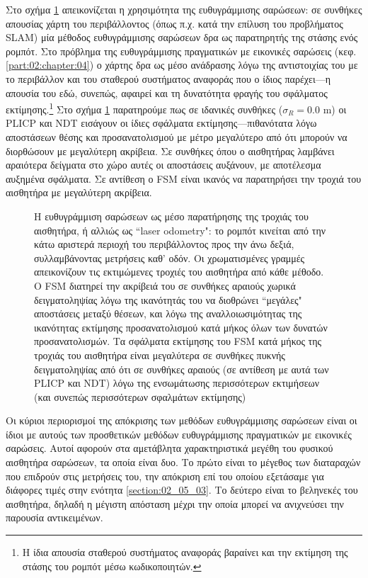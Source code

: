Στο σχήμα \ref{fig:02_05_04:01} απεικονίζεται η χρησιμότητα της ευθυγράμμισης
σαρώσεων: σε συνθήκες απουσίας χάρτη του περιβάλλοντος (όπως π.χ. κατά την
επίλυση του προβλήματος SLAM) μία μέθοδος ευθυγράμμισης σαρώσεων δρα ως
παρατηρητής της στάσης ενός ρομπότ. Στο πρόβλημα της ευθυγράμμισης πραγματικών
με εικονικές σαρώσεις (κεφ. \ref{part:02:chapter:04}) ο χάρτης δρα ως μέσο
ανάδρασης λόγω της αντιστοιχίας του με το περιβάλλον και του σταθερού
συστήματος αναφοράς που ο ίδιος παρέχει---η απουσία του εδώ, συνεπώς, αφαιρεί
και τη δυνατότητα φραγής του σφάλματος εκτίμησης.\footnote{Η ίδια απουσία
σταθερού συστήματος αναφοράς βαραίνει και την εκτίμηση της στάσης του ρομπότ
μέσω κωδικοποιητών.} Στο σχήμα \ref{fig:02_05_04:01} παρατηρούμε πως σε
ιδανικές συνθήκες ($\sigma_R = 0.0$ m) οι PLICP και NDT εισάγουν οι ίδιες
σφάλματα εκτίμησης---πιθανότατα λόγω αποστάσεων θέσης και προσανατολισμού με
μέτρο μεγαλύτερο από ότι μπορούν να διορθώσουν με μεγαλύτερη ακρίβεια. Σε
συνθήκες όπου ο αισθητήρας λαμβάνει αραιότερα δείγματα στο χώρο αυτές οι
αποστάσεις αυξάνουν, με αποτέλεσμα αυξημένα σφάλματα. Σε αντίθεση ο
FSM είναι ικανός να παρατηρήσει την τροχιά του αισθητήρα με μεγαλύτερη
ακρίβεια.

\begin{figure}[]\centering
  
  \vspace{-2cm}
  \caption{\small Η ευθυγράμμιση σαρώσεων ως μέσο παρατήρησης της τροχιάς του
           αισθητήρα, ή αλλιώς ως ``laser odometry": το ρομπότ κινείται από
           την κάτω αριστερά περιοχή του περιβάλλοντος προς την άνω δεξιά,
           συλλαμβάνοντας μετρήσεις καθ' οδόν. Οι χρωματισμένες γραμμές
           απεικονίζουν τις εκτιμώμενες τροχιές του αισθητήρα από κάθε μέθοδο.
           Ο FSM διατηρεί την ακρίβειά του σε συνθήκες αραιούς χωρικά
           δειγματοληψίας λόγω της ικανότητάς του να διοθρώνει ``μεγάλες"
           αποστάσεις μεταξύ θέσεων, και λόγω της αναλλοιωσιμότητας της
           ικανότητας εκτίμησης προσανατολισμού κατά μήκος όλων των δυνατών
           προσανατολισμών. Τα σφάλματα εκτίμησης του FSM κατά μήκος
           της τροχιάς του αισθητήρα είναι μεγαλύτερα σε συνθήκες πυκνής
           δειγματοληψίας από ότι σε συνθήκες αραιούς (σε αντίθεση με αυτά των
           PLICP και NDT) λόγω της ενσωμάτωσης περισσότερων εκτιμήσεων (και
           συνεπώς περισσότερων σφαλμάτων εκτίμησης)}
  \label{fig:02_05_04:01}
\end{figure}


Οι κύριοι περιορισμοί της απόκρισης των μεθόδων ευθυγράμμισης σαρώσεων είναι οι
ίδιοι με αυτούς των προσθετικών μεθόδων ευθυγράμμισης πραγματικών με εικονικές
σαρώσεις. Αυτοί αφορούν στα αμετάβλητα χαρακτηριστικά μεγέθη του φυσικού
αισθητήρα σαρώσεων, τα οποία είναι δυο. Το πρώτο είναι το μέγεθος των
διαταραχών που επιδρούν στις μετρήσεις του, την απόκριση επί του οποίου
εξετάσαμε για διάφορες τιμές στην ενότητα \ref{section:02_05_03}. Το δεύτερο
είναι το βεληνεκές του αισθητήρα, δηλαδή η μέγιστη απόσταση μέχρι την οποία
μπορεί να ανιχνεύσει την παρουσία αντικειμένων.

